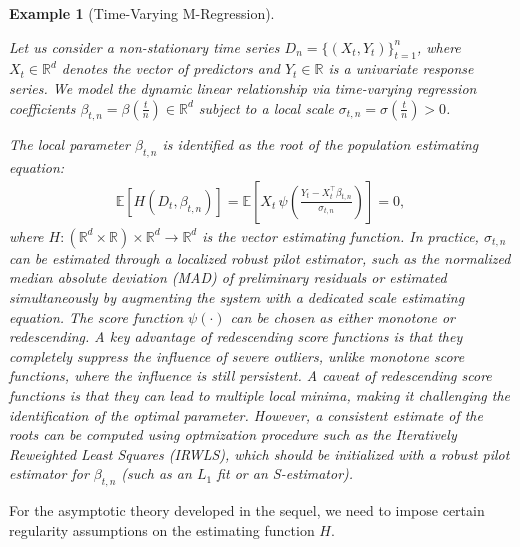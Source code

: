 \documentclass[10pt, a4paper]{article}
\theoremstyle{assumption}
\newtheorem{example}{Example}[section]
\theoremstyle{definition}
\theoremstyle{theorem}
\begin{document}
\begin{example}[Time-Varying M-Regression]
\label{ex:robtv}

Let us consider a non-stationary time series $D_n = \{ (X_t, Y_t) \}_{t=1}^n$, where $X_t \in \mathbb{R}^d$ denotes the vector of predictors and $Y_t \in \mathbb{R}$ is a univariate response series. We model the dynamic linear relationship via time-varying regression coefficients $\beta_{t,n} = \beta(\frac{t}{n}) \in \mathbb{R}^d$ subject to a local scale $\sigma_{t,n} = \sigma(\frac{t}{n}) > 0$. 

The local parameter $\beta_{t,n}$ is identified as the root of the population estimating equation:
\begin{align*}
    \mathbb{E}[H(D_t, \beta_{t,n})] = \mathbb{E}\left[ X_t \, \psi\left( \frac{Y_t - X_t^\top \beta_{t,n}}{\sigma_{t,n}} \right) \right] = 0,
\end{align*}
where $H : (\mathbb{R}^d \times \mathbb{R}) \times \mathbb{R}^d \to \mathbb{R}^d$ is the vector estimating function. In practice, $\sigma_{t,n}$ can be estimated through a localized robust pilot estimator, such as the normalized median absolute deviation (MAD) of preliminary residuals or estimated simultaneously by augmenting the system with a dedicated scale estimating equation. The score function $\psi(\cdot)$ can be chosen as either monotone  or redescending. A key advantage of redescending score functions is that they completely suppress the influence of severe outliers, unlike monotone score functions, where the influence is still persistent. A caveat of redescending score functions is that they can lead to multiple local minima, making it challenging the identification of the optimal parameter. However, a consistent estimate of the roots can be computed using optmization procedure such as the Iteratively Reweighted Least Squares (IRWLS), which should be initialized with a robust pilot estimator for \(\beta_{t,n}\) (such as an \(L_1\) fit or an S-estimator).

\end{example}

For the asymptotic theory developed in the sequel, we need to impose certain regularity assumptions on the estimating function $H$.
\end{document}
